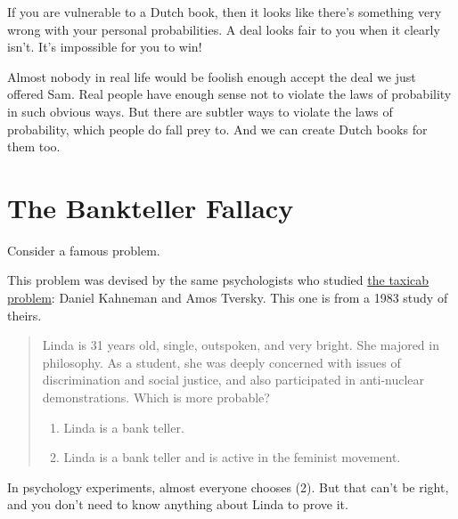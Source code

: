 \documentclass[justified]{tufte-book}
\providecommand{\tightlist}{%
  \setlength{\itemsep}{0pt}\setlength{\parskip}{0pt}}
\newenvironment{problem}{\begin{quote}\normalsize}{\end{quote}}
\theoremstyle{definition}
\theoremstyle{definition}
\theoremstyle{definition}
\theoremstyle{definition}
\theoremstyle{remark}
\begin{document}
If you are vulnerable to a Dutch book, then it looks like there's something very wrong with your personal probabilities. A deal looks fair to you when it clearly isn't. It's impossible for you to win!

Almost nobody in real life would be foolish enough accept the deal we just offered Sam. Real people have enough sense not to violate the laws of probability in such obvious ways. But there are subtler ways to violate the laws of probability, which people do fall prey to. And we can create Dutch books for them too.

\hypertarget{bankteller}{%
\section{The Bankteller Fallacy}\label{bankteller}}

Consider a famous problem.

\begin{marginfigure}
This problem was devised by the same psychologists who studied
\protect\hyperlink{chbayes}{the taxicab problem}: Daniel Kahneman and
Amos Tversky. This one is from a 1983 study of theirs.
\end{marginfigure}

\begin{problem}
Linda is 31 years old, single, outspoken, and very bright. She majored in philosophy. As a student, she was deeply concerned with issues of discrimination and social justice, and also participated in anti-nuclear demonstrations. Which is more probable?

\begin{enumerate}
\def\labelenumi{\arabic{enumi}.}
\tightlist
\item
  Linda is a bank teller.
\item
  Linda is a bank teller and is active in the feminist movement.
\end{enumerate}
\end{problem}

In psychology experiments, almost everyone chooses (2). But that can't be right, and you don't need to know anything about Linda to prove it.
\end{document}
